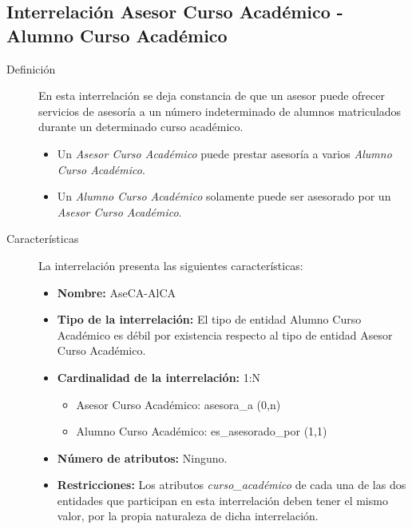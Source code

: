 \subsection{Interrelación Asesor Curso Académico - Alumno Curso Académico}

   \begin{description}
      \item[Definición] En esta interrelación se deja constancia de que un
      asesor puede ofrecer servicios de asesoría a un número indeterminado de
      alumnos matriculados durante un determinado curso académico.

      \begin{itemize}
       \item Un \textit{Asesor Curso Académico} puede prestar asesoría a varios
             \textit{Alumno Curso Académico}.
       \item Un \textit{Alumno Curso Académico} solamente puede ser asesorado
             por un \textit{Asesor Curso Académico}.
      \end{itemize}

      \item[Características] La interrelación presenta las siguientes
                             características:

         \begin{itemize}
            \item \textbf{Nombre:} AseCA-AlCA
            \item \textbf{Tipo de la interrelación:} El tipo de entidad
                  Alumno Curso Académico es débil por existencia respecto al
                  tipo de entidad Asesor Curso Académico.
            \item \textbf{Cardinalidad de la interrelación:} 1:N
                  \begin{itemize}
                     \item Asesor Curso Académico: asesora\_a (0,n)
                     \item Alumno Curso Académico: es\_asesorado\_por (1,1)
                  \end{itemize}
            \item \textbf{Número de atributos:} Ninguno.
            \item \textbf{Restricciones:} Los atributos
                   \textit{curso\_académico} de cada una de las dos entidades
                   que participan en esta interrelación deben tener el mismo
                   valor, por la propia naturaleza de dicha interrelación.
         \end{itemize}


\end{description}
